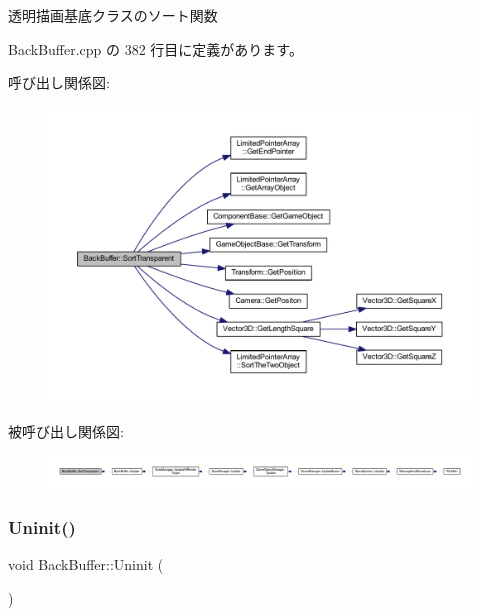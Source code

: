透明描画基底クラスのソート関数 



 Back\+Buffer.\+cpp の 382 行目に定義があります。

呼び出し関係図\+:
\nopagebreak
\begin{figure}[H]
\begin{center}
\leavevmode
\includegraphics[width=350pt]{class_back_buffer_af363b4d69affd48a1b0f65a000ff12b5_cgraph}
\end{center}
\end{figure}
被呼び出し関係図\+:
\nopagebreak
\begin{figure}[H]
\begin{center}
\leavevmode
\includegraphics[width=350pt]{class_back_buffer_af363b4d69affd48a1b0f65a000ff12b5_icgraph}
\end{center}
\end{figure}
\mbox{\label{class_back_buffer_a18f0eebb58ad22bc0514edddf966eea7}} 
\subsubsection{\texorpdfstring{Uninit()}{Uninit()}}
{\footnotesize\ttfamily void Back\+Buffer\+::\+Uninit (\begin{DoxyParamCaption}{ }\end{DoxyParamCaption})}



